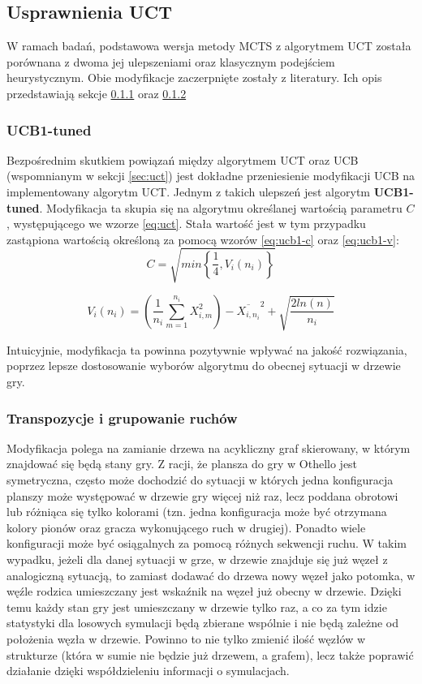 \documentclass[10pt]{article}
\begin{document}
\subsection{Usprawnienia UCT}
W ramach badań, podstawowa wersja metody MCTS z algorytmem UCT została porównana z dwoma jej ulepszeniami oraz klasycznym podejściem heurystycznym. Obie modyfikacje zaczerpnięte zostały z literatury. Ich opis przedstawiają sekcje \ref{sec:ucb1-tuned} oraz \ref{sec:mod2}

\subsubsection{UCB1-tuned}
\label{sec:ucb1-tuned}
Bezpośrednim skutkiem powiązań między algorytmem UCT oraz UCB (wspomnianym w sekcji \ref{sec:uct}) jest dokładne przeniesienie modyfikacji UCB na implementowany algorytm UCT. Jednym z takich ulepszeń jest algorytm \textbf{UCB1-tuned}. Modyfikacja ta skupia się na  algorytmu określanej wartością parametru $C$, występującego we wzorze \ref{eq:uct}. Stała wartość jest w tym przypadku zastąpiona wartością określoną za pomocą wzorów \ref{eq:ucb1-c} oraz \ref{eq:ucb1-v}:
\begin{equation}\label{eq:ucb1-c}
    C = \sqrt{min\left\{ \frac{1}{4}, V_i(n_i) \right\}}
\end{equation}

\begin{equation}\label{eq:ucb1-v}
    V_i(n_i) = \left(  \frac{1}{n_i} \sum_{m=1}^{n_i} X_{i,m}^{2} \right) - \overline{X_{i,n_i}}^{2} + \sqrt{\frac{2ln(n)}{n_i}}
\end{equation}

Intuicyjnie, modyfikacja ta powinna pozytywnie wpływać na jakość rozwiązania, poprzez lepsze dostosowanie wyborów algorytmu do obecnej sytuacji w drzewie gry.

\subsubsection{Transpozycje i grupowanie ruchów}
\label{sec:mod2}
Modyfikacja polega na zamianie drzewa na acykliczny graf skierowany, w którym znajdować się będą stany gry.
Z racji, że plansza do gry w Othello jest symetryczna, często może dochodzić do sytuacji w których jedna konfiguracja planszy może występować w drzewie gry więcej niż raz, lecz poddana obrotowi lub różniąca się tylko kolorami (tzn. jedna konfiguracja może być otrzymana  kolory pionów oraz gracza wykonującego ruch w drugiej). Ponadto wiele konfiguracji może być osiągalnych za pomocą różnych sekwencji ruchu. W takim wypadku, jeżeli dla danej sytuacji w grze, w drzewie znajduje się już węzeł z analogiczną sytuacją, to zamiast dodawać do drzewa nowy węzeł jako potomka, w węźle rodzica umieszczany jest wskaźnik na węzeł już obecny w drzewie. Dzięki temu każdy stan gry jest umieszczany w drzewie tylko raz, a co za tym idzie statystyki dla losowych symulacji będą zbierane wspólnie i nie będą zależne od położenia węzła w drzewie. Powinno to nie tylko zmienić ilość węzłów w strukturze (która w sumie nie będzie już drzewem, a grafem), lecz także poprawić działanie dzięki współdzieleniu informacji o symulacjach.
\end{document}

